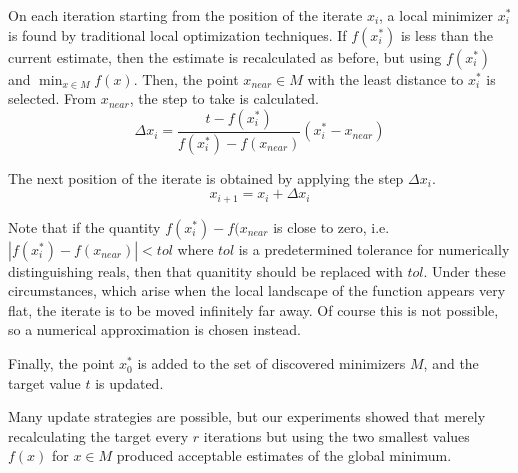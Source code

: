 \documentclass[12pt]{article}
\begin{document}
    On each iteration starting from the position of the iterate $x_i$, a local
    minimizer $x_i^*$ is found by traditional local optimization techniques.
    If $f(x_i^*)$ is less than the current estimate, then the estimate is
    recalculated as before, but using $f(x_i^*)$ and $\min_{x \in M} f(x)$.
    Then, the point $x_{near} \in M$ with the least distance to $x_i^*$ is
    selected.
    From $x_{near}$, the step to take is calculated.
    \begin{equation}
        \Delta x_i =
            \frac{t - f(x_i^*)}{f(x_i^*) - f(x_{near})} (x_i^* - x_{near})
        \label{eqn:dx}
    \end{equation}

    The next position of the iterate is obtained by applying the step
    $\Delta x_i$.
    $$
        x_{i+1} = x_i + \Delta x_i
    $$

    Note that if the quantity $f(x_i^*) - f(x_{near}$ is close to zero, i.e.
    $|f(x_i^*) - f(x_{near})| < tol$ where $tol$ is a predetermined tolerance
    for numerically distinguishing reals, then that quanitity should be
    replaced with $tol$. Under these circumstances, which arise when the local
    landscape of the function appears very flat, the iterate is to be moved
    infinitely far away. Of course this is not possible, so a numerical
    approximation is chosen instead.

    Finally, the point $x_0^*$ is added to the set of discovered minimizers
    $M$, and the target value $t$ is updated.

    Many update strategies are possible, but our experiments showed that merely
    recalculating the target every $r$ iterations but using the two smallest
    values $f(x)$ for $x \in M$ produced acceptable estimates of the global
    minimum.
\end{document}
